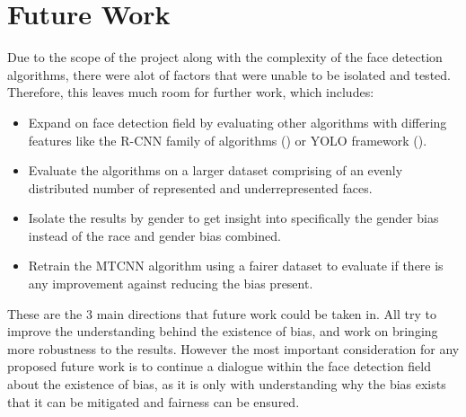 \documentclass{l4proj}
\begin{document}
\section{Future Work}
Due to the scope of the project along with the complexity of the face detection algorithms, there were alot of factors that were unable to be isolated and tested. Therefore, this leaves much room for further work, which includes:
\begin{itemize}
  \item Expand on face detection field by evaluating other algorithms with differing features like the R-CNN family of algorithms (\cite{rcnn}) or YOLO framework (\cite{yolo}). 
  \item Evaluate the algorithms on a larger dataset comprising of an evenly distributed number of represented and underrepresented faces.
  \item Isolate the results by gender to get insight into specifically the gender bias instead of the race and gender bias combined.
  \item Retrain the MTCNN algorithm using a fairer dataset to evaluate if there is any improvement against reducing the bias present.
\end{itemize}
These are the 3 main directions that future work could be taken in. All try to improve the understanding behind the existence of bias, and work on bringing more robustness to the results. However the most important consideration for any proposed future work is to continue a dialogue within the face detection field about the existence of bias, as it is only with understanding why the bias exists that it can be mitigated and fairness can be ensured.





\end{document}
